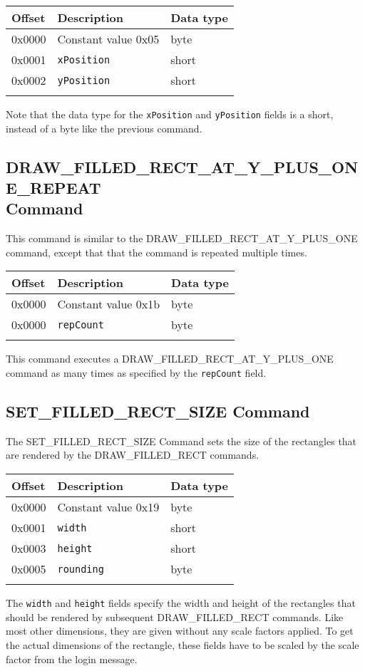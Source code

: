 \documentclass{article}
\newcommand{\field}[1]{\textcolor{fieldColor}{\texttt{#1}}}
\newenvironment{bytelisting}
{\ttfamily \begin{center} \begin{tabular}{l l l} Offset & Description & Data type \\ \hline}
{\normalfont \end{tabular} \end{center}}
\begin{document}
\begin{bytelisting}
0x0000 & Constant value 0x05 & byte \\
0x0001 & \field{xPosition} & short \\
0x0002 & \field{yPosition} & short \\
\end{bytelisting}

Note that the data type for the \field{xPosition} and \field{yPosition} fields is a short, instead of a byte like the previous command.

\subsection{DRAW\_FILLED\_RECT\_AT\_Y\_PLUS\_ONE\_REPEAT \\ Command}
This command is similar to the DRAW\_FILLED\_RECT\_AT\_Y\_PLUS\_ONE command, except that that the command is repeated multiple times.

\begin{bytelisting}
0x0000 & Constant value 0x1b & byte \\
0x0000 & \field{repCount} & byte \\
\end{bytelisting}

This command executes a DRAW\_FILLED\_RECT\_AT\_Y\_PLUS\_ONE command as many times as specified by the \field{repCount} field.

\subsection{SET\_FILLED\_RECT\_SIZE Command}
The SET\_FILLED\_RECT\_SIZE Command sets the size of the rectangles that are rendered by the DRAW\_FILLED\_RECT commands.

\begin{bytelisting}
0x0000 & Constant value 0x19 & byte \\
0x0001 & \field{width} & short \\
0x0003 & \field{height} & short \\
0x0005 & \field{rounding} & byte \\
\end{bytelisting}

The \field{width} and \field{height} fields specify the width and height of the rectangles that should be rendered by subsequent DRAW\_FILLED\_RECT commands. Like most other dimensions, they are given
without any scale factors applied. To get the actual dimensions of the rectangle, these fields have to be scaled by the scale factor from the login message.
\end{document}

